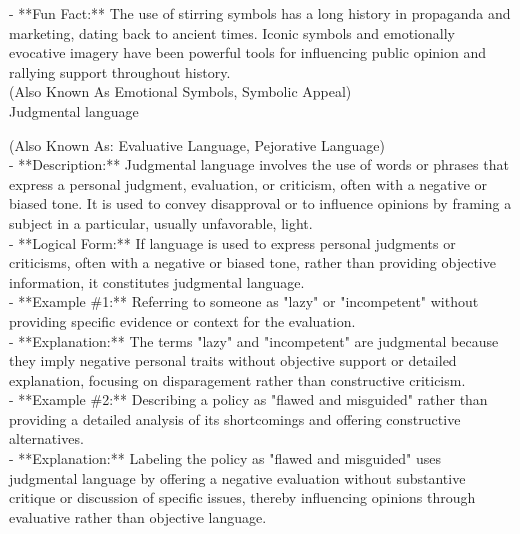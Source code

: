 \documentclass[a4paper,12pt,single,pdftex]{scrartcl}
\begin{document}
    
      - **Fun Fact:** The use of stirring symbols has a long history in propaganda and marketing, dating back to ancient times. Iconic symbols and emotionally evocative imagery have been powerful tools for influencing public opinion and rallying support throughout history.
    \\

  
    
      (Also Known As Emotional Symbols, Symbolic Appeal)
    \\

  

Judgmental language
    
      (Also Known As: Evaluative Language, Pejorative Language)
    \\

  
    
      - **Description:** Judgmental language involves the use of words or phrases that express a personal judgment, evaluation, or criticism, often with a negative or biased tone. It is used to convey disapproval or to influence opinions by framing a subject in a particular, usually unfavorable, light.
    \\

    
      - **Logical Form:** If language is used to express personal judgments or criticisms, often with a negative or biased tone, rather than providing objective information, it constitutes judgmental language.
    \\

    
      - **Example \#1:** Referring to someone as "lazy" or "incompetent" without providing specific evidence or context for the evaluation.
    \\

    
      - **Explanation:** The terms "lazy" and "incompetent" are judgmental because they imply negative personal traits without objective support or detailed explanation, focusing on disparagement rather than constructive criticism.
    \\

    
      - **Example \#2:** Describing a policy as "flawed and misguided" rather than providing a detailed analysis of its shortcomings and offering constructive alternatives.
    \\

    
      - **Explanation:** Labeling the policy as "flawed and misguided" uses judgmental language by offering a negative evaluation without substantive critique or discussion of specific issues, thereby influencing opinions through evaluative rather than objective language.
    \\
\end{document}
